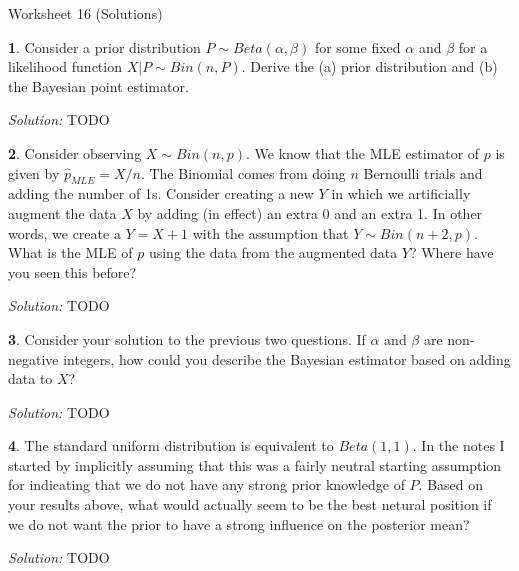 \documentclass{tufte-handout}
\begin{document}
\justify

{\LARGE Worksheet 16 (Solutions)}

\vspace*{18pt}


\textbf{1}. Consider a prior distribution $P \sim Beta(\alpha, \beta)$ for some fixed
$\alpha$ and $\beta$ for a likelihood function $X|P \sim Bin(n, P)$. Derive
the (a) prior distribution and (b) the Bayesian point estimator.

\textit{Solution:} TODO

\textbf{2}. Consider observing $X \sim Bin(n, p)$. We know that the MLE estimator of $p$ is
given by $\hat{p}_{MLE} = X / n$. The Binomial comes from doing $n$ Bernoulli
trials and adding the number of 1s. Consider creating a new $Y$ in which we 
artificially augment the data $X$ by adding (in effect) an extra 0 and an extra
1. In other words, we create a $Y = X + 1$ with the assumption that
$Y \sim Bin(n+2, p)$. What is the MLE of $p$ using the data from the augmented
data $Y$? Where have you seen this before?

\textit{Solution:} TODO

\textbf{3}. Consider your solution to the previous two questions. If $\alpha$ and $\beta$
are non-negative integers, how could you describe the Bayesian estimator based
on adding data to $X$? 

\textit{Solution:} TODO

\textbf{4}. The standard uniform distribution is equivalent to $Beta(1,1)$. In the notes
I started by implicitly assuming that this was a fairly neutral starting
assumption for indicating that we do not have any strong prior knowledge of
$P$. Based on your results above, what would actually seem to be the best
netural position if we do not want the prior to have a strong influence on 
the posterior mean?

\textit{Solution:} TODO
\end{document}
